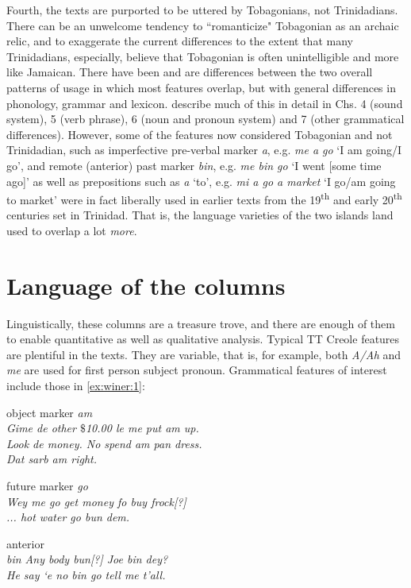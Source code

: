 \documentclass[output=paper,colorlinks,citecolor=brown]{langscibook}
\begin{document}
Fourth, the texts are purported to be uttered by Tobagonians, not Trinidadians. There can be an unwelcome tendency to ``romanticize" Tobagonian as an archaic relic, and to exaggerate the current differences to the extent that many Trinidadians, especially, believe that Tobagonian is often unintelligible and more like Jamaican.  There have been and are differences between the two overall patterns of usage in which most features overlap, but with general differences in phonology, grammar and lexicon.  \citet{jamesyoussef2002} describe much of this in detail in Chs. 4 (sound system), 5 (verb phrase), 6 (noun and pronoun system) and 7 (other grammatical differences).  However, some of the features now considered Tobagonian and not Trinidadian, such as imperfective pre-verbal marker \textit{a}, e.g. \textit{me a go} ‘I am going/I go’, and remote (anterior) past marker \textit{bin}, e.g. \textit{me bin go} ‘I went [some time ago]’ as well as prepositions such as \textit{a} ‘to’, e.g. \textit{mi a go a market} ‘I go/am going to market’ were in fact liberally used in earlier texts from the 19\textsuperscript{th} and early 20\textsuperscript{th} centuries set in Trinidad.  That is, the language varieties of the two islands land used to overlap a lot \textit{more}.


\section{Language of the columns}
\largerpage
Linguistically, these columns are a treasure trove, and there are enough of them to enable quantitative as well as qualitative analysis.  Typical TT Creole features are plentiful in the texts. They are variable, that is, for example, both \textit{A/Ah} and \textit{me} are used for first person subject pronoun. Grammatical features of interest include those in \ref{ex:winer:1}:

\ea%
	\label{ex:winer:1}
\ea object marker \textit{am}\\
    \textit{Gi}\textit{me de other $\$$10.00 le me put am up.}\\
    \textit{Look de money. No spend am pan dress.}\\
    \textit{Dat sarb am right.}

\ex future marker \textit{go}\\
    \textit{Wey me go get money fo buy frock[?]}\\
    \textit{... hot water go bun dem.}

\ex anterior\\
    \textit{bin Any body bun[?] Joe bin dey?}\\
    \textit{He say ‘e no bin go tell me t’all.}
\end{document}

